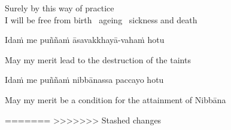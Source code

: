 \begin{english}
  Surely by this way of practice\\
  I will be free from birth \breathmark\ ageing \breathmark\ sickness and death
\end{english}

Idaṁ me puññaṁ āsavakkhayā-vahaṁ hotu

\begin{english}
  May my merit lead to the destruction of the taints
\end{english}

Idaṁ me puññaṁ nibbānassa paccayo hotu

\begin{english}
  May my merit be a condition for the attainment of Nibbāna
\end{english}



\endgroup
=======
>>>>>>> Stashed changes

